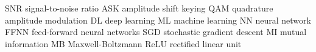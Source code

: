\makeglossaries %
%
%
%
%
%
%
 {SNR} {signal-to-noise ratio}
%
 {ASK} {amplitude shift keying}
%
 {QAM} {quadrature amplitude modulation}
%
 {DL} {deep learning}
%
 {ML} {machine learning}
%
 {NN} {neural network}
%
 {FFNN} {feed-forward neural networks}
%
 {SGD} {stochastic gradient descent}
%
 {MI} {mutual information}
%
 {MB} {Maxwell-Boltzmann}
%
 {ReLU} {rectified linear unit}